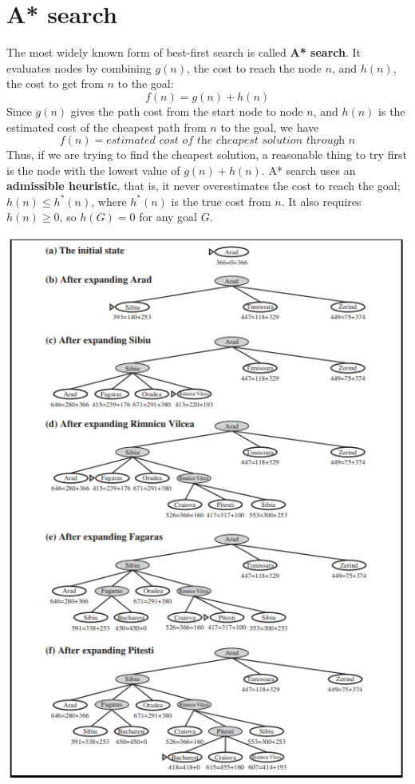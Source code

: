 \section{A* search}
The most widely known form of best-first search is called \textbf{A* search}. It evaluates nodes by combining $g(n)$, the cost to reach the node $n$, and $h(n)$, the cost to get from $n$ to the goal:
\[f(n) = g(n) + h(n)\]
Since $g(n)$ gives the path cost from the start node to node $n$, and $h(n)$ is the estimated cost of the cheapest path from $n$ to the goal, we have
\[f(n) = \textit{estimated cost of the cheapest solution through n}\]
Thus, if we are trying to find the cheapest solution, a reasonable thing to try first is the node with the lowest value of $g(n) + h(n)$.\newline\newline
A* search uses an \textbf{admissible heuristic}, that is, it never overestimates the cost to reach the goal; $h(n) \leq h^*(n)$, where $h^*(n)$ is the true cost from $n$. It also requires $h(n) \geq 0$, so $h(G) = 0$ for any goal $G$.
\begin{center}
    \includegraphics[]{images/A-search.png}
\end{center}

